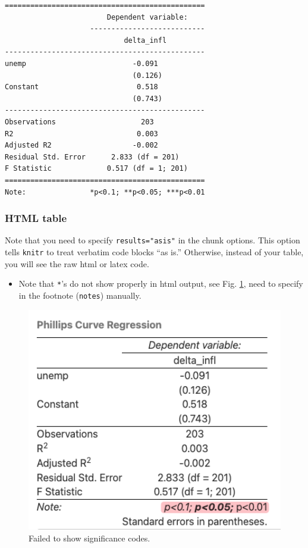 \documentclass[
  a4paper,
  twoside,
  openright]{book}
\providecommand{\tightlist}{%
  \setlength{\itemsep}{0pt}\setlength{\parskip}{0pt}}
\theoremstyle{definition}
\theoremstyle{definition}
\theoremstyle{definition}
\theoremstyle{definition}
\theoremstyle{remark}
\begin{document}
\begin{verbatim}
===============================================
                        Dependent variable:    
                    ---------------------------
                            delta_infl         
-----------------------------------------------
unemp                         -0.091           
                              (0.126)          
Constant                       0.518           
                              (0.743)          
-----------------------------------------------
Observations                    203            
R2                             0.003           
Adjusted R2                   -0.002           
Residual Std. Error      2.833 (df = 201)      
F Statistic             0.517 (df = 1; 201)    
===============================================
Note:               *p<0.1; **p<0.05; ***p<0.01
\end{verbatim}

\subsubsection*{HTML table}\label{html-table}

Note that you need to specify \texttt{results="asis"} in the chunk options. This option tells \texttt{knitr} to treat verbatim code blocks ``as is.'' Otherwise, instead of your table, you will see the raw html or latex code.

\begin{itemize}
\tightlist
\item
  Note that \texttt{*}'s do not show properly in html output, see Fig. \ref{fig:stargazer1}, need to specify in the footnote (\texttt{notes}) manually.
\end{itemize}

\begin{figure}
\includegraphics[width=5.51in]{images/stargazer1} \caption{Failed to show significance codes.}\label{fig:stargazer1}
\end{figure}
\end{document}
